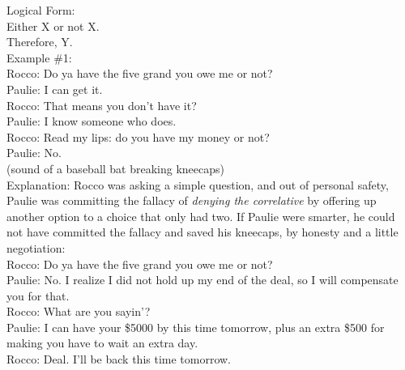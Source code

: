 \documentclass[a4paper,12pt,single,pdftex]{scrartcl}
\begin{document}
    
      Logical Form:
    \\

    
      Either X or not X.
    \\

    
      Therefore, Y.
    \\

    
      Example \#1:
    \\

    
      Rocco:  Do ya have the five grand you owe me or not?
    \\

    
      Paulie: I can get it.
    \\

    
      Rocco: That means you don’t have it?
    \\

    
      Paulie: I know someone who does.
    \\

    
      Rocco: Read my lips: do you have my money or not?
    \\

    
      Paulie: No.
    \\

    
      (sound of a baseball bat breaking kneecaps)
    \\

    
      Explanation: Rocco was asking a simple question, and out of personal safety, Paulie was committing the fallacy of {\it denying the correlative} by offering up another option to a choice that only had two.  If Paulie were smarter, he could not have committed the fallacy and saved his kneecaps, by honesty and a little negotiation:
    \\

    
      Rocco:  Do ya have the five grand you owe me or not?
    \\

    
      Paulie: No. I realize I did not hold up my end of the deal, so I will compensate you for that.
    \\

    
      Rocco: What are you sayin’?
    \\

    
      Paulie: I can have your \$5000 by this time tomorrow, plus an extra \$500 for making you have to wait an extra day.
    \\

    
      Rocco: Deal.  I’ll be back this time tomorrow.
    \\
\end{document}
